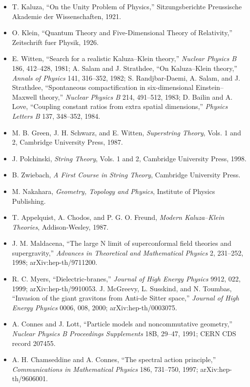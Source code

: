 \documentclass[11pt]{article}
\begin{document}
\begin{itemize}
\item T. Kaluza, ``On the Unity Problem of Physics,'' Sitzungsberichte Preussische Akademie der Wissenschaften, 1921.
\item O. Klein, ``Quantum Theory and Five-Dimensional Theory of Relativity,'' Zeitschrift fuer Physik, 1926.
\item E. Witten, ``Search for a realistic Kaluza--Klein theory,'' \textit{Nuclear Physics B} 186, 412--428, 1981; A. Salam and J. Strathdee, ``On Kaluza--Klein theory,'' \textit{Annals of Physics} 141, 316--352, 1982; S. Randjbar-Daemi, A. Salam, and J. Strathdee, ``Spontaneous compactification in six-dimensional Einstein--Maxwell theory,'' \textit{Nuclear Physics B} 214, 491--512, 1983; D. Bailin and A. Love, ``Coupling constant ratios from extra spatial dimensions,'' \textit{Physics Letters B} 137, 348--352, 1984.
\item M. B. Green, J. H. Schwarz, and E. Witten, \textit{Superstring Theory}, Vols. 1 and 2, Cambridge University Press, 1987.
\item J. Polchinski, \textit{String Theory}, Vols. 1 and 2, Cambridge University Press, 1998.
\item B. Zwiebach, \textit{A First Course in String Theory}, Cambridge University Press.
\item M. Nakahara, \textit{Geometry, Topology and Physics}, Institute of Physics Publishing.
\item T. Appelquist, A. Chodos, and P. G. O. Freund, \textit{Modern Kaluza--Klein Theories}, Addison-Wesley, 1987.
\item J. M. Maldacena, ``The large N limit of superconformal field theories and supergravity,'' \textit{Advances in Theoretical and Mathematical Physics} 2, 231--252, 1998; arXiv:hep-th/9711200.
\item R. C. Myers, ``Dielectric-branes,'' \textit{Journal of High Energy Physics} 9912, 022, 1999; arXiv:hep-th/9910053. J. McGreevy, L. Susskind, and N. Toumbas, ``Invasion of the giant gravitons from Anti-de Sitter space,'' \textit{Journal of High Energy Physics} 0006, 008, 2000; arXiv:hep-th/0003075.
\item A. Connes and J. Lott, ``Particle models and noncommutative geometry,'' \textit{Nuclear Physics B Proceedings Supplements} 18B, 29--47, 1991; CERN CDS record 207455.
\item A. H. Chamseddine and A. Connes, ``The spectral action principle,'' \textit{Communications in Mathematical Physics} 186, 731--750, 1997; arXiv:hep-th/9606001.

\end{itemize}
\end{document}
